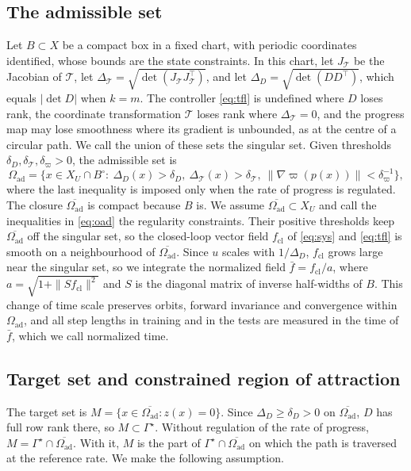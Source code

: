 \documentclass{l4dc2027}
\newcommand{\Oad}{\Omega_{\mathrm{ad}}}
\newcommand{\Tm}{\mathcal T}
\begin{document}
\subsection{The admissible set}\label{sec:oad}
 Let $B\subset X$ be a compact box in a fixed chart, with periodic coordinates identified, whose bounds are the state constraints. In this chart, let $J_\Tm$ be the Jacobian of $\Tm$, let $\Delta_\Tm=\sqrt{\det(J_\Tm J_\Tm^\top)}$, and let $\Delta_D=\sqrt{\det(DD^\top)}$, which equals $|\det D|$ when $k=m$. The controller \eqref{eq:tfl} is undefined where $D$ loses rank, the coordinate transformation $\Tm$ loses rank where $\Delta_\Tm=0$, and the progress map may lose smoothness where its gradient is unbounded, as at the centre of a circular path. We call the union of these sets the singular set. Given thresholds $\delta_D,\delta_\Tm,\delta_\varpi>0$, the admissible set is
\begin{equation}\label{eq:oad}
\Oad=\{x\in X_U\cap B^\circ:\ \Delta_D(x)>\delta_D,\ \Delta_\Tm(x)>\delta_\Tm,\ \|\nabla\varpi(p(x))\|<\delta_\varpi^{-1}\},
\end{equation}
where the last inequality is imposed only when the rate of progress is regulated. The closure $\overline{\Oad}$ is compact because $B$ is. We assume $\overline{\Oad}\subset X_U$ and call the inequalities in \eqref{eq:oad} the regularity constraints. Their positive thresholds keep $\overline{\Oad}$ off the singular set, so the closed-loop vector field $f_{\mathrm{cl}}$ of \eqref{eq:sys} and \eqref{eq:tfl} is smooth on a neighbourhood of $\overline{\Oad}$. Since $u$ scales with $1/\Delta_D$, $f_{\mathrm{cl}}$ grows large near the singular set, so we integrate the normalized field $\bar f=f_{\mathrm{cl}}/a$, where $a=\sqrt{1+\|Sf_{\mathrm{cl}}\|^2}$ and $S$ is the diagonal matrix of inverse half-widths of $B$. This change of time scale preserves orbits, forward invariance and convergence within $\Oad$, and all step lengths in training and in the tests are measured in the time of $\bar f$, which we call normalized time.

\vspace{-0.075in}

\subsection{Target set and constrained region of attraction}\label{sec:roa}
The target set is $M=\{x\in\overline{\Oad}:z(x)=0\}$. Since $\Delta_D\ge\delta_D>0$ on $\overline{\Oad}$, $D$ has full row rank there, so $M\subset\Gamma^\star$. Without regulation of the rate of progress, $M=\Gamma^\star\cap\overline{\Oad}$. With it, $M$ is the part of $\Gamma^\star\cap\overline{\Oad}$ on which the path is traversed at the reference rate. We make the following assumption.
\end{document}
